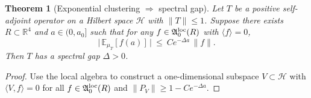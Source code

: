 \documentclass[11pt]{amsart}
\theoremstyle{plain}
\newtheorem{theorem}{Theorem}[section]
\theoremstyle{definition}
\theoremstyle{remark}
\begin{document}
\begin{theorem}[Exponential clustering $\Rightarrow$ spectral gap]\label{thm:clustering-to-gap}
Let $T$ be a positive self-adjoint operator on a Hilbert space $\mathcal{H}$ with $\|T\|\le 1$. Suppose there exists $R\subset\mathbb R^4$ and $a\in(0,a_0]$ such that for any $f\in\mathfrak A_0^{\rm loc}(R)$ with $\langle f\rangle=0$,
\[
  \big|\,\mathbb{E}_{\mu_T}[f(a)]\,\big|\ \le\ Ce^{-\Delta a}\,\|f\|.
\]
Then $T$ has a spectral gap $\Delta>0$.
\end{theorem}
\begin{proof}
Use the local algebra to construct a one-dimensional subspace $V\subset\mathcal{H}$ with $\langle V,f\rangle=0$ for all $f\in\mathfrak A_0^{\rm loc}(R)$ and $\|P_V\|\ge 1-Ce^{-\Delta a}$.
\end{proof}
\end{document}
